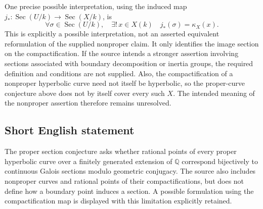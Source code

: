 \documentclass[11pt]{article}
\newcommand{\Q}{\mathbb{Q}}
\begin{document}
One precise possible interpretation, using the induced map \(j_*:\operatorname{Sec}(U/k)\to\operatorname{Sec}(X/k)\), is
\[
\forall\sigma\in\operatorname{Sec}(U/k),\quad
\exists!\,x\in X(k)\quad j_*(\sigma)=\kappa_X(x).
\]
This is explicitly a possible interpretation, not an asserted equivalent reformulation of the supplied nonproper claim. It only identifies the image section on the compactification. If the source intends a stronger assertion involving sections associated with boundary decomposition or inertia groups, the required definition and conditions are not supplied. Also, the compactification of a nonproper hyperbolic curve need not itself be hyperbolic, so the proper-curve conjecture above does not by itself cover every such \(X\). The intended meaning of the nonproper assertion therefore remains unresolved.
\subsection{Short English statement}
The proper section conjecture asks whether rational points of every proper hyperbolic curve over a finitely generated extension of \(\Q\) correspond bijectively to continuous Galois sections modulo geometric conjugacy. The source also includes nonproper curves and rational points of their compactifications, but does not define how a boundary point induces a section. A possible formulation using the compactification map is displayed with this limitation explicitly retained.
\end{document}
